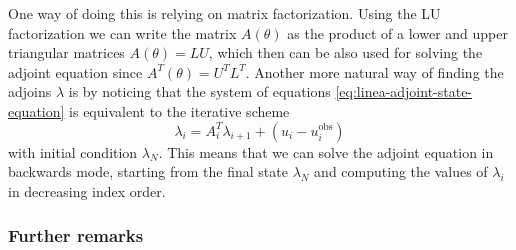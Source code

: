 One way of doing this is relying on matrix factorization. 
Using the LU factorization we can write the matrix $A(\theta)$ as the product of a lower and upper triangular matrices $A (\theta) = LU$, which then can be also used for solving the adjoint equation since $A^T(\theta)=U^TL^T$.
Another more natural way of finding the adjoins $\lambda$ is by noticing that the system of equations \eqref{eq:linea-adjoint-state-equation} is equivalent to the iterative scheme
\begin{equation}
    \lambda_{i} = A_{i}^T \lambda_{i+1} + (u_i - u_i^\text{obs})
\end{equation}
with initial condition $\lambda_N$. 
This means that we can solve the adjoint equation in backwards mode, starting from the final state $\lambda_N$ and computing the values of $\lambda_i$ in decreasing index order. 



\subsubsection{Further remarks}

